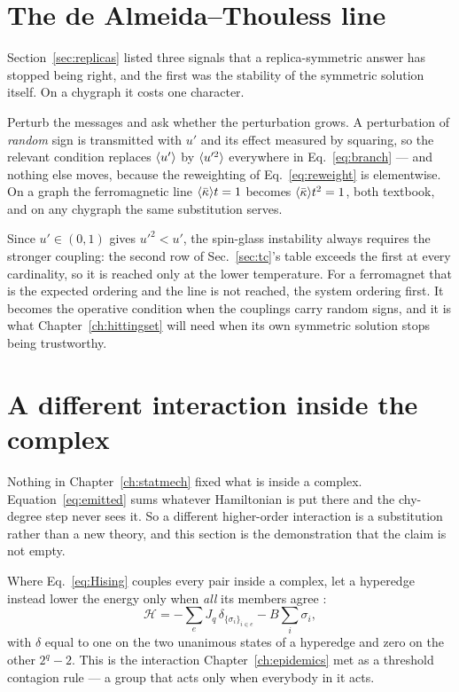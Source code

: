 \section{The de Almeida--Thouless line}
\label{sec:atline}

Section~\ref{sec:replicas} listed three signals that a replica-symmetric answer
has stopped being right, and the first was the stability of the symmetric
solution itself. On a chygraph it costs one character.

Perturb the messages and ask whether the perturbation grows. A perturbation of
\emph{random} sign is transmitted with $u'$ and its effect measured by squaring,
so the relevant condition replaces $\langle u' \rangle$ by $\langle u'^{2} \rangle$ everywhere in
Eq.~\eqref{eq:branch} --- and nothing else moves, because the reweighting of
Eq.~\eqref{eq:reweight} is elementwise. On a graph the ferromagnetic line
$\langle \bar\kappa \rangle t=1$ becomes $\langle \bar\kappa \rangle t^{2}=1$, both textbook, and on any
chygraph the same substitution serves.

Since $u'\in(0,1)$ gives $u'^{2}<u'$, the spin-glass instability always requires
the stronger coupling: the second row of Sec.~\ref{sec:tc}'s table exceeds the
first at every cardinality, so it is reached only at the lower temperature. For a ferromagnet that is the expected ordering
and the line is not reached, the system ordering first. It becomes the operative
condition when the couplings carry random signs, and it is what
Chapter~\ref{ch:hittingset} will need when its own symmetric solution stops
being trustworthy.

\section{A different interaction inside the complex}
\label{sec:unanimity}

Nothing in Chapter~\ref{ch:statmech} fixed what is inside a complex.
Equation~\eqref{eq:emitted} sums whatever Hamiltonian is put there and the
chy-degree step never sees it. So a different higher-order interaction is a
substitution rather than a new theory, and this section is the demonstration
that the claim is not empty.

Where Eq.~\eqref{eq:Hising} couples every pair inside a complex, let a hyperedge
instead lower the energy only when \emph{all} its members agree
\citep{son2026}:
\begin{equation}
  \mathcal{H}=-\sum_{e}J_{q}\,\delta_{\{\sigma_{i}\}_{i\in e}}
              -B\sum_{i}\sigma_{i},
  \label{eq:simH}
\end{equation}
with $\delta$ equal to one on the two unanimous states of a hyperedge and zero
on the other $2^{q}-2$. This is the interaction
Chapter~\ref{ch:epidemics} met as a threshold contagion rule --- a group that
acts only when everybody in it acts.

